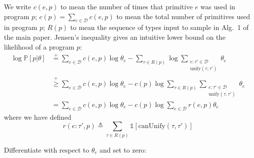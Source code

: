 \documentclass{article}
\DeclareMathOperator*{\argmax}{arg\,max} %
\newcommand{\indicator}{\mathds{1}} %
\newcommand{\expect}{\mathds{E}} %
\newcommand{\probability}{\mathds{P}} %
\begin{document}
We write $c(e,p)$ to mean the number of times that primitive $e$ was used in program $p$; $c(p)= \sum_{e\in \mathcal{D}}c(e,p)$ to mean the total number of primitives used in program $p$; $R(p)$ to mean the sequence of types input to sample in Alg.~1 of the main paper. Jensen's inequality gives an intuitive lower bound on the likelihood of a program $p$:
\begin{align*}
  \log \probability[p|\theta]&\stackrel{+}{ = }\sum_{e\in \mathcal{D}} c(e,p)\log \theta_e - \sum_{\tau\in R(p)} \log \sum_{\substack{e:\tau'\in \mathcal{D}\\\text{unify}(\tau,\tau')}}\theta_e\\
  &\stackrel{+}{\geq }\sum_{e\in \mathcal{D}} c(e,p)\log \theta_e - c(p)\log \sum_{\tau\in R(p)} \sum_{\substack{e:\tau'\in \mathcal{D}\\\text{unify}(\tau,\tau')}}\theta_e\\
  & = \sum_{e\in \mathcal{D}} c(e,p)\log \theta_e - c(p)\log \sum_{e\in \mathcal{D}} r(e,p)\theta_e
\end{align*}
where we have defined
$$r(e:\tau',p)\triangleq\sum_{\tau\in R(p)} \indicator[\text{canUnify}(\tau,\tau')]$$





Differentiate with respect to $\theta_e$ and set to zero:
\end{document}
